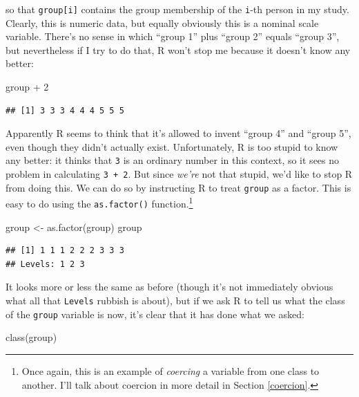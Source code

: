 \documentclass[
]{book}
\newenvironment{Shaded}{\begin{snugshade}}{\end{snugshade}}
\newcommand{\DecValTok}[1]{\textcolor[rgb]{0.00,0.00,0.81}{#1}}
\newcommand{\FunctionTok}[1]{\textcolor[rgb]{0.00,0.00,0.00}{#1}}
\newcommand{\NormalTok}[1]{#1}
\newcommand{\OtherTok}[1]{\textcolor[rgb]{0.56,0.35,0.01}{#1}}
\newcommand{\SpecialCharTok}[1]{\textcolor[rgb]{0.00,0.00,0.00}{#1}}
\begin{document}
so that \texttt{group{[}i{]}} contains the group membership of the \texttt{i}-th person in my study. Clearly, this is numeric data, but equally obviously this is a nominal scale variable. There's no sense in which ``group 1'' plus ``group 2'' equals ``group 3'', but nevertheless if I try to do that, R won't stop me because it doesn't know any better:

\begin{Shaded}
\begin{Highlighting}[]
\NormalTok{group }\SpecialCharTok{+} \DecValTok{2}
\end{Highlighting}
\end{Shaded}

\begin{verbatim}
## [1] 3 3 3 4 4 4 5 5 5
\end{verbatim}

Apparently R seems to think that it's allowed to invent ``group 4'' and ``group 5'', even though they didn't actually exist. Unfortunately, R is too stupid to know any better: it thinks that \texttt{3} is an ordinary number in this context, so it sees no problem in calculating \texttt{3\ +\ 2}. But since \emph{we're} not that stupid, we'd like to stop R from doing this. We can do so by instructing R to treat \texttt{group} as a factor. This is easy to do using the \texttt{as.factor()} function.\footnote{Once again, this is an example of \emph{coercing} a variable from one class to another. I'll talk about coercion in more detail in Section \ref{coercion}.}

\begin{Shaded}
\begin{Highlighting}[]
\NormalTok{group }\OtherTok{\textless{}{-}} \FunctionTok{as.factor}\NormalTok{(group)}
\NormalTok{group}
\end{Highlighting}
\end{Shaded}

\begin{verbatim}
## [1] 1 1 1 2 2 2 3 3 3
## Levels: 1 2 3
\end{verbatim}

It looks more or less the same as before (though it's not immediately obvious what all that \texttt{Levels} rubbish is about), but if we ask R to tell us what the class of the \texttt{group} variable is now, it's clear that it has done what we asked:

\begin{Shaded}
\begin{Highlighting}[]
\FunctionTok{class}\NormalTok{(group)}
\end{Highlighting}
\end{Shaded}
\end{document}
